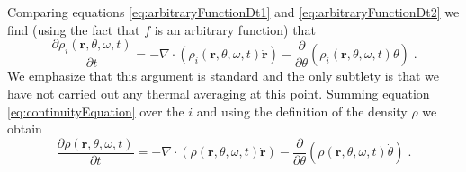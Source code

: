 \documentclass{article}
\begin{document}
Comparing equations \eqref{eq:arbitraryFunctionDt1} and \eqref{eq:arbitraryFunctionDt2} we find (using the fact that $f$ is an arbitrary function) that
\begin{equation}
    \label{eq:continuityEquation}
    \frac{\partial \rho _i\left( \mathbf{r},\theta ,\omega ,t \right)}{\partial t}=-\nabla \cdot \left( \rho _i\left( \mathbf{r},\theta ,\omega ,t \right) \mathbf{\dot{r}} \right) -\frac{\partial}{\partial \theta}\left( \rho _i\left( \mathbf{r},\theta ,\omega ,t \right) \dot{\theta} \right)\;.
\end{equation}
We emphasize that this argument is standard and the only subtlety is that we have not carried out any thermal averaging at this point. Summing equation \eqref{eq:continuityEquation} over the $i$ and using the definition of the density $\rho$ we obtain
\begin{equation}
    \frac{\partial \rho \left( \mathbf{r},\theta ,\omega ,t \right)}{\partial t}=-\nabla \cdot \left( \rho \left( \mathbf{r},\theta ,\omega ,t \right) \mathbf{\dot{r}} \right) -\frac{\partial}{\partial \theta}\left( \rho \left( \mathbf{r},\theta ,\omega ,t \right) \dot{\theta} \right)\;.
\end{equation}
\end{document}
